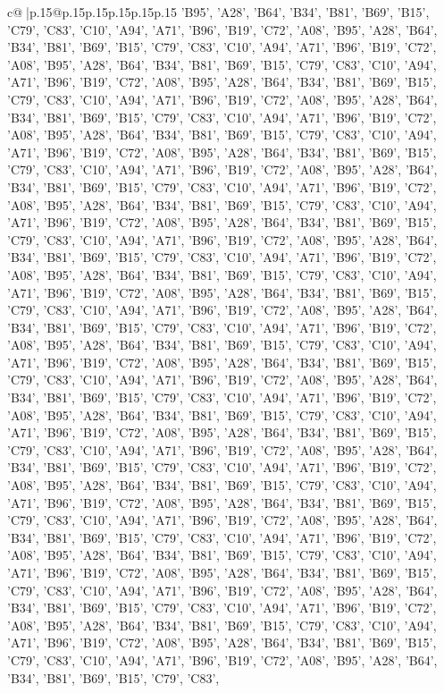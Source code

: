 \documentclass{article}
\begin{document}
{\begin{supertabular}{c@{$\;$}|p{.15\linewidth}@{}p{.15\linewidth}p{.15\linewidth}p{.15\linewidth}p{.15\linewidth}p{.15\linewidth}}
{{{'B95', 'A28', 'B64', 'B34', 'B81', 'B69', 'B15', 'C79', 'C83', 'C10', 'A94', 'A71', 'B96', 'B19', 'C72', 'A08', 'B95', 'A28', 'B64', 'B34', 'B81', 'B69', 'B15', 'C79', 'C83', 'C10', 'A94', 'A71', 'B96', 'B19', 'C72', 'A08', 'B95', 'A28', 'B64', 'B34', 'B81', 'B69', 'B15', 'C79', 'C83', 'C10', 'A94', 'A71', 'B96', 'B19', 'C72', 'A08', 'B95', 'A28', 'B64', 'B34', 'B81', 'B69', 'B15', 'C79', 'C83', 'C10', 'A94', 'A71', 'B96', 'B19', 'C72', 'A08', 'B95', 'A28', 'B64', 'B34', 'B81', 'B69', 'B15', 'C79', 'C83', 'C10', 'A94', 'A71', 'B96', 'B19', 'C72', 'A08', 'B95', 'A28', 'B64', 'B34', 'B81', 'B69', 'B15', 'C79', 'C83', 'C10', 'A94', 'A71', 'B96', 'B19', 'C72', 'A08', 'B95', 'A28', 'B64', 'B34', 'B81', 'B69', 'B15', 'C79', 'C83', 'C10', 'A94', 'A71', 'B96', 'B19', 'C72', 'A08', 'B95', 'A28', 'B64', 'B34', 'B81', 'B69', 'B15', 'C79', 'C83', 'C10', 'A94', 'A71', 'B96', 'B19', 'C72', 'A08', 'B95', 'A28', 'B64', 'B34', 'B81', 'B69', 'B15', 'C79', 'C83', 'C10', 'A94', 'A71', 'B96', 'B19', 'C72', 'A08', 'B95', 'A28', 'B64', 'B34', 'B81', 'B69', 'B15', 'C79', 'C83', 'C10', 'A94', 'A71', 'B96', 'B19', 'C72', 'A08', 'B95', 'A28', 'B64', 'B34', 'B81', 'B69', 'B15', 'C79', 'C83', 'C10', 'A94', 'A71', 'B96', 'B19', 'C72', 'A08', 'B95', 'A28', 'B64', 'B34', 'B81', 'B69', 'B15', 'C79', 'C83', 'C10', 'A94', 'A71', 'B96', 'B19', 'C72', 'A08', 'B95', 'A28', 'B64', 'B34', 'B81', 'B69', 'B15', 'C79', 'C83', 'C10', 'A94', 'A71', 'B96', 'B19', 'C72', 'A08', 'B95', 'A28', 'B64', 'B34', 'B81', 'B69', 'B15', 'C79', 'C83', 'C10', 'A94', 'A71', 'B96', 'B19', 'C72', 'A08', 'B95', 'A28', 'B64', 'B34', 'B81', 'B69', 'B15', 'C79', 'C83', 'C10', 'A94', 'A71', 'B96', 'B19', 'C72', 'A08', 'B95', 'A28', 'B64', 'B34', 'B81', 'B69', 'B15', 'C79', 'C83', 'C10', 'A94', 'A71', 'B96', 'B19', 'C72', 'A08', 'B95', 'A28', 'B64', 'B34', 'B81', 'B69', 'B15', 'C79', 'C83', 'C10', 'A94', 'A71', 'B96', 'B19', 'C72', 'A08', 'B95', 'A28', 'B64', 'B34', 'B81', 'B69', 'B15', 'C79', 'C83', 'C10', 'A94', 'A71', 'B96', 'B19', 'C72', 'A08', 'B95', 'A28', 'B64', 'B34', 'B81', 'B69', 'B15', 'C79', 'C83', 'C10', 'A94', 'A71', 'B96', 'B19', 'C72', 'A08', 'B95', 'A28', 'B64', 'B34', 'B81', 'B69', 'B15', 'C79', 'C83', 'C10', 'A94', 'A71', 'B96', 'B19', 'C72', 'A08', 'B95', 'A28', 'B64', 'B34', 'B81', 'B69', 'B15', 'C79', 'C83', 'C10', 'A94', 'A71', 'B96', 'B19', 'C72', 'A08', 'B95', 'A28', 'B64', 'B34', 'B81', 'B69', 'B15', 'C79', 'C83', 'C10', 'A94', 'A71', 'B96', 'B19', 'C72', 'A08', 'B95', 'A28', 'B64', 'B34', 'B81', 'B69', 'B15', 'C79', 'C83', 'C10', 'A94', 'A71', 'B96', 'B19', 'C72', 'A08', 'B95', 'A28', 'B64', 'B34', 'B81', 'B69', 'B15', 'C79', 'C83', 'C10', 'A94', 'A71', 'B96', 'B19', 'C72', 'A08', 'B95', 'A28', 'B64', 'B34', 'B81', 'B69', 'B15', 'C79', 'C83', 'C10', 'A94', 'A71', 'B96', 'B19', 'C72', 'A08', 'B95', 'A28', 'B64', 'B34', 'B81', 'B69', 'B15', 'C79', 'C83', 'C10', 'A94', 'A71', 'B96', 'B19', 'C72', 'A08', 'B95', 'A28', 'B64', 'B34', 'B81', 'B69', 'B15', 'C79', 'C83', 'C10', 'A94', 'A71', 'B96', 'B19', 'C72', 'A08', 'B95', 'A28', 'B64', 'B34', 'B81', 'B69', 'B15', 'C79', 'C83', 'C10', 'A94', 'A71', 'B96', 'B19', 'C72', 'A08', 'B95', 'A28', 'B64', 'B34', 'B81', 'B69', 'B15', 'C79', 'C83', }}}
\end{supertabular}}
\end{document}
